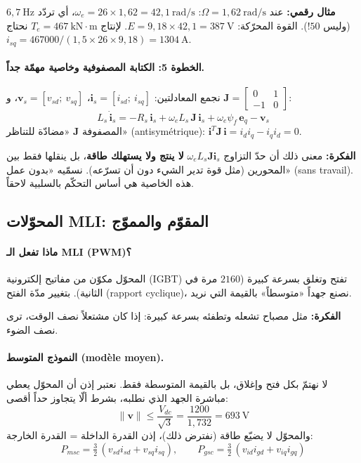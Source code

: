 \documentclass[11pt,a4paper]{article}
\newcommand{\fr}[1]{\textfrench{#1}}
\newcommand{\bv}[1]{\boldsymbol{#1}}
\newcommand{\Fikra}{\textbf{الفكرة: }}
\newcommand{\Mithal}{\textbf{مثال رقمي: }}
\begin{document}
\begin{mithal}
\Mithal
عند $\Omega=1{,}62\ \mathrm{rad/s}$: $\omega_e = 26\times 1{,}62 = 42{,}1\ \mathrm{rad/s}$، أي تردّد
$6{,}7\ \mathrm{Hz}$ (وليس $50$!). القوة المحرّكة: $E = 9{,}18\times 42{,}1 = 387\ \mathrm{V}$.
لإنتاج $T_e = 467\ \mathrm{kN\cdot m}$ نحتاج $i_{sq} = 467000/(1{,}5\times 26\times 9{,}18) = 1304\ \mathrm{A}$.
\end{mithal}

\paragraph{الخطوة 5: الكتابة المصفوفية وخاصية مهمّة جداً.}
نجمع المعادلتين: $\bv{i}_s=[i_{sd};\ i_{sq}]$، $\bv{v}_s=[v_{sd};\ v_{sq}]$، و
$\mathbf{J}=\begin{bmatrix}0&1\\-1&0\end{bmatrix}$:
\begin{equation}
L_s\,\dot{\bv{i}}_s = -R_s\,\bv{i}_s + \omega_e L_s\,\mathbf{J}\,\bv{i}_s + \omega_e\psi_f\,\bv{e}_q - \bv{v}_s
\end{equation}
المصفوفة $\mathbf{J}$ «مضادّة للتناظر» (\fr{antisymétrique}): $\bv{i}^T\mathbf{J}\,\bv{i} = i_d i_q - i_q i_d = 0$.
\begin{fikra}
\Fikra
معنى ذلك أن حدّ التزاوج $\omega_e L_s\mathbf{J}\bv{i}_s$ \textbf{لا ينتج ولا يستهلك طاقة}، بل ينقلها فقط
بين المحورين (مثل قوة تدير الشيء دون أن تسرّعه). نسمّيه «بدون عمل» (\fr{sans travail}).
هذه الخاصية هي أساس التحكّم بالسلبية لاحقاً.
\end{fikra}

\subsection{المحوّلات \fr{MLI}: المقوّم والمموّج}
\paragraph{ماذا تفعل الـ \fr{MLI} (\fr{PWM})؟}
المحوّل مكوّن من مفاتيح إلكترونية (\fr{IGBT}) تفتح وتغلق بسرعة كبيرة ($2160$ مرة في الثانية).
بتغيير مدّة الفتح (\fr{rapport cyclique})، نصنع جهداً «متوسطاً» بالقيمة التي نريد.
\begin{fikra}
\Fikra
مثل مصباح تشعله وتطفئه بسرعة كبيرة: إذا كان مشتعلاً نصف الوقت، ترى نصف الضوء.
\end{fikra}

\paragraph{النموذج المتوسط (\fr{modèle moyen}).}
لا نهتمّ بكل فتح وإغلاق، بل بالقيمة المتوسطة فقط. نعتبر إذن أن المحوّل يعطي مباشرة الجهد الذي
نطلبه، بشرط ألّا يتجاوز حداً أقصى:
\begin{equation}
\|\bv{v}\| \le \frac{V_{dc}}{\sqrt3} = \frac{1200}{1{,}732} = 693\ \mathrm{V}
\end{equation}
والمحوّل لا يضيّع طاقة (نفترض ذلك)، إذن القدرة الداخلة = القدرة الخارجة:
\begin{equation}
P_{msc} = \tfrac32\,(v_{sd}i_{sd}+v_{sq}i_{sq}),\qquad P_{gsc} = \tfrac32\,(v_{id}i_{gd}+v_{iq}i_{gq})
\end{equation}
\end{document}
